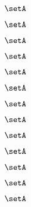 \begin{forslides}
    \begin{equation}
        \label{eq:parallelism-166}
        \setA
    \end{equation}

    \begin{equation}
        \label{eq:parallelism-167}
        \setA
    \end{equation}

    \begin{equation}
        \label{eq:parallelism-168}
        \setA
    \end{equation}

    \begin{equation}
        \label{eq:parallelism-169}
        \setA
    \end{equation}

    \begin{equation}
        \label{eq:parallelism-170}
        \setA
    \end{equation}

    \begin{equation}
        \label{eq:parallelism-171}
        \setA
    \end{equation}

    \begin{equation}
        \label{eq:parallelism-172}
        \setA
    \end{equation}

    \begin{equation}
        \label{eq:parallelism-173}
        \setA
    \end{equation}

    \begin{equation}
        \label{eq:parallelism-174}
        \setA
    \end{equation}

    \begin{equation}
        \label{eq:parallelism-175}
        \setA
    \end{equation}

    \begin{equation}
        \label{eq:parallelism-176}
        \setA
    \end{equation}

    \begin{equation}
        \label{eq:parallelism-177}
        \setA
    \end{equation}

    \begin{equation}
        \label{eq:parallelism-178}
        \setA
    \end{equation}


\end{forslides}
